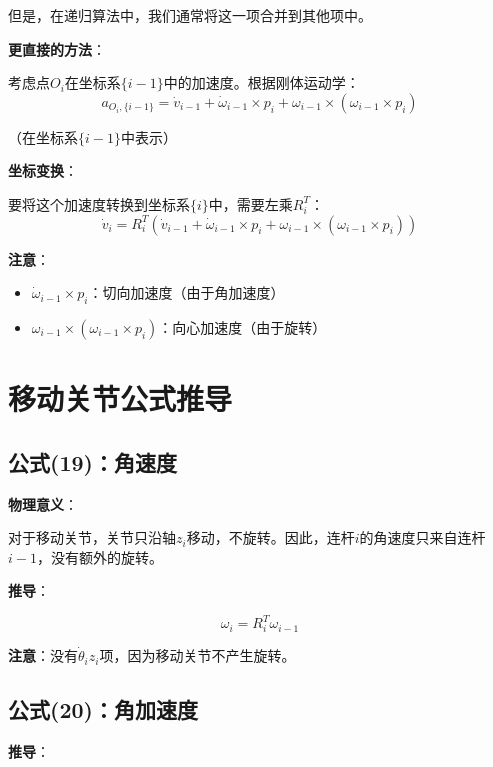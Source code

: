 \documentclass[12pt,a4paper]{article}
\begin{document}
但是，在递归算法中，我们通常将这一项合并到其他项中。

\textbf{更直接的方法}：

考虑点$O_i$在坐标系$\{i-1\}$中的加速度。根据刚体运动学：
\begin{equation}
a_{O_i, \{i-1\}} = \dot{v}_{i-1} + \dot{\omega}_{i-1} \times p_i + \omega_{i-1} \times (\omega_{i-1} \times p_i)
\end{equation}

（在坐标系$\{i-1\}$中表示）

\textbf{坐标变换}：

要将这个加速度转换到坐标系$\{i\}$中，需要左乘$R_i^T$：
\begin{equation}
\dot{v}_i = R_i^T (\dot{v}_{i-1} + \dot{\omega}_{i-1} \times p_i + \omega_{i-1} \times (\omega_{i-1} \times p_i)) \tag{18}
\end{equation}

\textbf{注意}：
\begin{itemize}
\item $\dot{\omega}_{i-1} \times p_i$：切向加速度（由于角加速度）
\item $\omega_{i-1} \times (\omega_{i-1} \times p_i)$：向心加速度（由于旋转）
\end{itemize}

\section{移动关节公式推导}

\subsection{公式(19)：角速度}

\textbf{物理意义}：

对于移动关节，关节只沿轴$z_i$移动，不旋转。因此，连杆$i$的角速度只来自连杆$i-1$，没有额外的旋转。

\textbf{推导}：

\begin{equation}
\omega_i = R_i^T \omega_{i-1} \tag{19}
\end{equation}

\textbf{注意}：没有$\dot{\theta}_i z_i$项，因为移动关节不产生旋转。

\subsection{公式(20)：角加速度}

\textbf{推导}：
\end{document}
